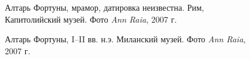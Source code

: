 \begin{appendices}
\begin{figure}[ht!]
\caption{Алтарь Фортуны, мрамор, датировка неизвестна. Рим, Капитолийский музей. \footnotesize{Фото \textit{Ann Raia}, 2007 г.}}
\label{pic:Ara1}
\end{figure}


\begin{figure}[ht!]
\caption{Алтарь Фортуны, I--II вв. н.э. Миланский музей. \footnotesize{Фото \textit{Ann Raia}, 2007 г.}}
\label{pic:Ara2}
\end{figure}


\end{appendices}
